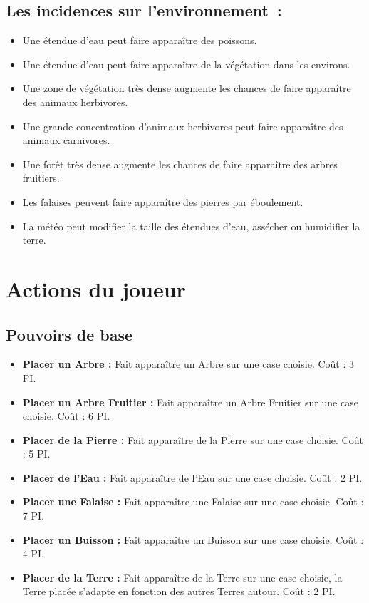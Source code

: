 \documentclass[a4paper]{article}
\begin{document}
      \subsection{Les incidences sur l'environnement :}
        \begin{itemize} \small
          \item Une étendue d'eau peut faire apparaître des poissons.
          \item Une étendue d'eau peut faire apparaître de la végétation dans les environs.
          \item Une zone de végétation très dense augmente les chances de faire apparaître des animaux herbivores.
          \item Une grande concentration d'animaux herbivores peut faire apparaître des animaux carnivores.
          \item Une forêt très dense augmente les chances de faire apparaître des arbres fruitiers.
          \item Les falaises peuvent faire apparaître des pierres par éboulement.
          \item La météo peut modifier la taille des étendues d'eau, assécher ou humidifier la terre.
        \end{itemize} \normalsize


    \section{Actions du joueur}

      \subsection{Pouvoirs de base}
        \begin{itemize}
          \item \textbf{Placer un Arbre :} \small{ Fait apparaître un Arbre sur une case choisie. Coût : 3 PI.}
          \item \textbf{Placer un Arbre Fruitier :} \small{ Fait apparaître un Arbre Fruitier sur une case choisie. Coût : 6 PI.}
          \item \textbf{Placer de la Pierre :} \small{ Fait apparaître de la Pierre sur une case choisie. Coût : 5 PI.}
          \item \textbf{Placer de l'Eau :} \small{ Fait apparaître de l'Eau sur une case choisie. Coût : 2 PI.}
          \item \textbf{Placer une Falaise :} \small{ Fait apparaître une Falaise sur une case choisie. Coût : 7 PI.}
          \item \textbf{Placer un Buisson :} \small{ Fait apparaître un Buisson sur une case choisie. Coût : 4 PI.}
          \item \textbf{Placer de la Terre :} \small{ Fait apparaître de la Terre sur une case choisie, la Terre placée s'adapte en fonction des autres Terres autour. Coût : 2 PI.}
        \end{itemize}
\end{document}
